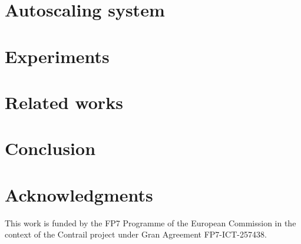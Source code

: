 \documentclass{sig-alternate-10pt}
\begin{document}
%


%


\section{Autoscaling system}




\section{Experiments \label{sec:experiments}}



\section{Related works \label{sec:relatedWorks}}



\section{Conclusion \label{sec:conclusion}}



\section{Acknowledgments}
This work is funded by the FP7 Programme of the European Commission in the context of the Contrail project under Gran Agreement FP7-ICT-257438.

\balancecolumns



\end{document}

